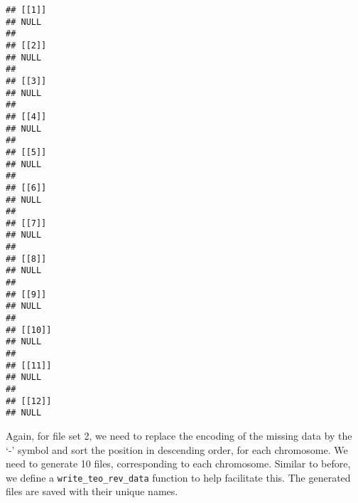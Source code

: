 \documentclass[
]{article}
\newenvironment{Shaded}{\begin{snugshade}}{\end{snugshade}}
\newcommand{\AttributeTok}[1]{\textcolor[rgb]{0.13,0.29,0.53}{#1}}
\newcommand{\CommentTok}[1]{\textcolor[rgb]{0.56,0.35,0.01}{\textit{#1}}}
\newcommand{\ConstantTok}[1]{\textcolor[rgb]{0.56,0.35,0.01}{#1}}
\newcommand{\ControlFlowTok}[1]{\textcolor[rgb]{0.13,0.29,0.53}{\textbf{#1}}}
\newcommand{\FunctionTok}[1]{\textcolor[rgb]{0.13,0.29,0.53}{\textbf{#1}}}
\newcommand{\NormalTok}[1]{#1}
\newcommand{\OtherTok}[1]{\textcolor[rgb]{0.56,0.35,0.01}{#1}}
\newcommand{\SpecialCharTok}[1]{\textcolor[rgb]{0.81,0.36,0.00}{\textbf{#1}}}
\newcommand{\StringTok}[1]{\textcolor[rgb]{0.31,0.60,0.02}{#1}}
\begin{document}
\begin{Shaded}
\end{Shaded}

\begin{verbatim}
## [[1]]
## NULL
## 
## [[2]]
## NULL
## 
## [[3]]
## NULL
## 
## [[4]]
## NULL
## 
## [[5]]
## NULL
## 
## [[6]]
## NULL
## 
## [[7]]
## NULL
## 
## [[8]]
## NULL
## 
## [[9]]
## NULL
## 
## [[10]]
## NULL
## 
## [[11]]
## NULL
## 
## [[12]]
## NULL
\end{verbatim}

Again, for file set 2, we need to replace the encoding of the missing
data by the `-' symbol and sort the position in descending order, for
each chromosome. We need to generate 10 files, corresponding to each
chromosome. Similar to before, we define a
\texttt{write\_teo\_rev\_data} function to help facilitate this. The
generated files are saved with their unique names.
\end{document}
